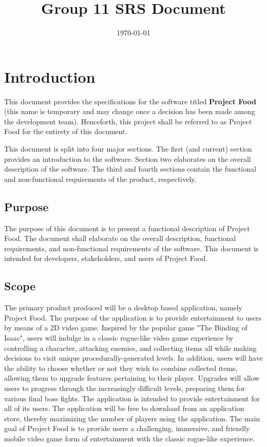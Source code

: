 \documentclass[12pt, titlepage]{article}
\title{Group 11 SRS Document}
\author{}
\date{\today}
\begin{document}
\maketitle

\tableofcontents
\listoftables
\listoffigures

\newpage


\section{Introduction}
This document provides the specifications for the software titled \textbf{Project Food} (this name is temporary and may change once a decision has been made among the development team). Henceforth, this project shall be referred to as Project Food for the entirety of this document.

This document is split into four major sections. The first (and current) section provides an introduction to the software. Section two elaborates on the overall description of the software. The third and fourth sections contain the functional and non-functional requirements of the product, respectively.

  \subsection{Purpose} 
  The purpose of this document is to present a functional description of Project Food. The document shall elaborate on the overall description, functional requirements, and non-functional requirements of the software. This document is intended for developers, stakeholders, and users of Project Food.
  \subsection{Scope}

  The primary product produced will be a desktop based application, namely Project Food. The purpose of the application is to provide entertainment to users by means of a 2D video game. Inspired by the popular game "The Binding of Isaac", users will indulge in a classic rogue-like video game experience by controlling a character, attacking enemies, and collecting items all while making decisions to visit unique procedurally-generated levels. In addition, users will have the ability to choose whether or not they wish to combine collected items, allowing them to upgrade features pertaining to their player. Upgrades will allow users to progress through the increasingly difficult levels, preparing them for various final boss fights.
  The application is intended to provide entertainment for all of its users. The application will be free to download from an application store, thereby maximizing the number of players using the application. The main goal of Project Food is to provide users a challenging, immersive, and friendly mobile video game form of entertainment with the classic rogue-like experience.
\end{document}
